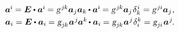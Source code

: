 \begin{otherlanguage}{russian}
\nopagebreak\vspace{-0.12em}
\begin{equation}\begin{array}{c}
\bm{a}^{\hspace{-0.05ex}i} \hspace{-0.1ex}
= \UnitDyad \dotp \bm{a}^{\hspace{-0.05ex}i} \hspace{-0.15ex}
= \textsl{g}^{\hspace{.2ex}j\hspace{-0.1ex}k} \bm{a}_j \bm{a}_k \hspace{-0.1ex} \dotp \bm{a}^{\hspace{-0.05ex}i} \hspace{-0.15ex}
= \textsl{g}^{\hspace{.2ex}j\hspace{-0.1ex}k} \bm{a}_j \hspace{.16ex} \delta_{k}^{\hspace{.1ex}i}
= \textsl{g}^{\hspace{.2ex}j\hspace{-0.06ex}i} \bm{a}_j \hspace{.1ex} ,
\\[.25em]
%
\bm{a}_i
= \UnitDyad \dotp \bm{a}_i \hspace{-0.1ex}
= \textsl{g}_{j\hspace{-0.1ex}k} \hspace{.1ex} \bm{a}^{\hspace{.1ex}j} \hspace{-0.1ex} \bm{a}^{k} \hspace{-0.2ex} \dotp \bm{a}_i \hspace{-0.1ex}
= \textsl{g}_{j\hspace{-0.1ex}k} \hspace{.1ex} \bm{a}^{\hspace{.1ex}j} \hspace{.1ex} \delta_{i}^{k}
= \textsl{g}_{j\hspace{-0.06ex}i} \hspace{.16ex} \bm{a}^{\hspace{.1ex}j} \hspace{-0.2ex} .
\end{array}\end{equation}

\begin{tcolorbox}
\small\setlength{\abovedisplayskip}{2pt}\setlength{\belowdisplayskip}{2pt}


\end{tcolorbox}
\end{otherlanguage}
